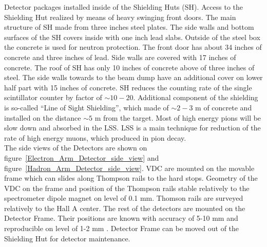 \documentclass[12pt]{article}
\begin{document}
Detector packages installed inside of the Shielding Huts (SH). Access to the Shielding Hut 
realized by means of heavy swinging front doors. The main structure of SH made from three
inches steel plates. The side walls and bottom surfaces of the SH covers inside with one inch
lead slabs. Outside of the steel box the concrete is used for neutron protection. 
The front door has about 34 inches of concrete and three inches of lead. Side walls are 
covered with 17 inches of concrete. The roof of SH has only 10 inches of concrete above 
of three inches of steel. The side walls towards to the beam dump have an additional cover on lower 
half part with 15 inches of concrete.
SH reduces the counting rate of the single scintillator counter by factor of $\sim 10-20$.
Additional component of the shielding is so-called
``Line of Sight Shielding'', which made of $\sim 2-3$ m of concrete and installed on the distance 
$\sim 5$ m from the target. Most of high energy pions will be slow down and absorbed in the LSS.    
LSS is a main technique for reduction of the rate of high energy muons, which produced in pion decay.\\
  
The side views of the Detectors are shown on figure~\ref{Electron_Arm_Detector_side_view} and 
figure~\ref{Hadron_Arm_Detector_side_view}. VDC are mounted on the movable frame which can 
slides along Thompson rails to the hard stops. Geometry of the VDC on the frame and  position of the 
Thompson rails stable relatively to the spectrometer dipole magnet on level of 0.1 mm. Thomson rails are
surveyed relatively to the Hall A center. The rest of the detectors are mounted 
on the Detector Frame. Their positions are known with accuracy of 5-10 mm and
reproducible on level of 1-2 mm . Detector Frame can be moved out of the Shielding Hut 
for detector maintenance.   
\end{document}
